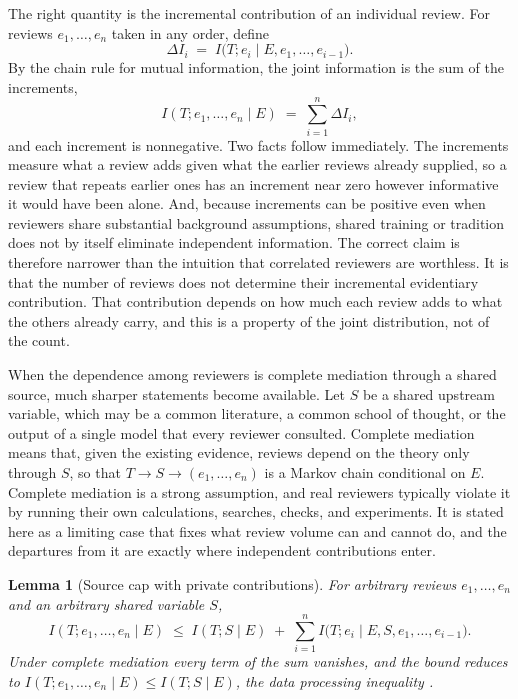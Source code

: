 \documentclass[11pt]{article}
\newtheorem{lemma}{Lemma}
\theoremstyle{remark}
\begin{document}
The right quantity is the incremental contribution of an individual review. For reviews $e_1,\dots,e_n$ taken in any order, define
\begin{equation}
\Delta I_i \;=\; I\bigl(T;e_i\mid E,e_1,\dots,e_{i-1}\bigr).
\label{eq:delta}
\end{equation}
By the chain rule for mutual information, the joint information is the sum of the increments,
\begin{equation}
I(T;e_1,\dots,e_n\mid E)\;=\;\sum_{i=1}^{n}\Delta I_i,
\label{eq:chain}
\end{equation}
and each increment is nonnegative. Two facts follow immediately. The increments measure what a review adds given what the earlier reviews already supplied, so a review that repeats earlier ones has an increment near zero however informative it would have been alone. And, because increments can be positive even when reviewers share substantial background assumptions, shared training or tradition does not by itself eliminate independent information. The correct claim is therefore narrower than the intuition that correlated reviewers are worthless. It is that the number of reviews does not determine their incremental evidentiary contribution. That contribution depends on how much each review adds to what the others already carry, and this is a property of the joint distribution, not of the count.

When the dependence among reviewers is complete mediation through a shared source, much sharper statements become available. Let $S$ be a shared upstream variable, which may be a common literature, a common school of thought, or the output of a single model that every reviewer consulted. Complete mediation means that, given the existing evidence, reviews depend on the theory only through $S$, so that $T\to S\to(e_1,\dots,e_n)$ is a Markov chain conditional on $E$. Complete mediation is a strong assumption, and real reviewers typically violate it by running their own calculations, searches, checks, and experiments. It is stated here as a limiting case that fixes what review volume can and cannot do, and the departures from it are exactly where independent contributions enter.

\begin{lemma}[Source cap with private contributions]
For arbitrary reviews $e_1,\dots,e_n$ and an arbitrary shared variable $S$,
\begin{equation}
I(T;e_1,\dots,e_n\mid E)\;\le\;I(T;S\mid E)\;+\;\sum_{i=1}^{n} I\bigl(T;e_i\mid E,S,e_1,\dots,e_{i-1}\bigr).
\label{eq:private}
\end{equation}
Under complete mediation every term of the sum vanishes, and the bound reduces to $I(T;e_1,\dots,e_n\mid E)\le I(T;S\mid E)$, the data processing inequality \cite{cover2006}.
\end{lemma}
\end{document}
